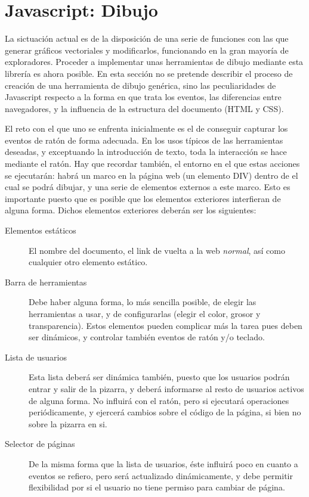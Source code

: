 \section{Javascript: Dibujo} %
\label{sec:javascript_dibujo}
La sictuación actual es de la disposición de una serie de funciones con las que generar gráficos vectoriales y modificarlos, funcionando en la gran mayoría de exploradores. Proceder a implementar unas herramientas de dibujo mediante esta librería es ahora posible. En esta sección no se pretende describir el proceso de creación de una herramienta de dibujo genérica, sino las peculiaridades de Javascript respecto a la forma en que trata los eventos, las diferencias entre navegadores, y la influencia de la estructura del documento (HTML y CSS).

El reto con el que uno se enfrenta inicialmente es el de conseguir capturar los eventos de ratón de forma adecuada. En los usos típicos de las herramientas deseadas, y exceptuando la introducción de texto, toda la interacción se hace mediante el ratón. Hay que recordar también, el entorno en el que estas acciones se ejecutarán: habrá un marco en la página web (un elemento DIV) dentro de el cual se podrá dibujar, y una serie de elementos externos a este marco. Esto es importante puesto que es posible que los elementos exteriores interfieran de alguna forma. Dichos elementos exteriores deberán ser los siguientes:

\begin{description}
  \item[Elementos estáticos] El nombre del documento, el link de vuelta a la web \emph{normal}, así como cualquier otro elemento estático.
  \item[Barra de herramientas] Debe haber alguna forma, lo más sencilla posible, de elegir las herramientas a usar, y de configurarlas (elegir el color, grosor y transparencia). Estos elementos pueden complicar más la tarea pues deben ser dinámicos, y controlar también eventos de ratón y/o teclado.
  \item[Lista de usuarios] Esta lista deberá ser dinámica también, puesto que los usuarios podrán entrar y salir de la pizarra, y deberá informarse al resto de usuarios activos de alguna forma. No influirá con el ratón, pero si ejecutará operaciones periódicamente, y ejercerá cambios sobre el código de la página, si bien no sobre la pizarra en si.  
  \item[Selector de páginas] De la misma forma que la lista de usuarios, éste influirá poco en cuanto a eventos se refiero, pero será actualizado dinámicamente, y debe permitir flexibilidad por si el usuario no tiene permiso para cambiar de página.
\end{description}

